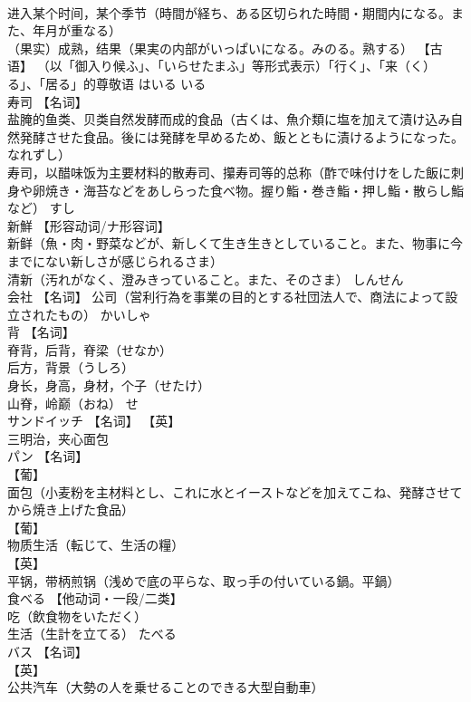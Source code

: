\documentclass[8pt]{extreport}
\begin{document}
\begin{CJK}{UTF8}{min}
\\	进入某个时间，某个季节（時間が経ち、ある区切られた時間・期間内になる。また、年月が重なる） 
\\	（果实）成熟，结果（果実の内部がいっぱいになる。みのる。熟する） 【古语】 （以「御入り候ふ」、「いらせたまふ」等形式表示）「行く」、「来（く）る」、「居る」的尊敬语	はいる いる	
\\	寿司	【名词】 
\\	盐腌的鱼类、贝类自然发酵而成的食品（古くは、魚介類に塩を加えて漬け込み自然発酵させた食品。後には発酵を早めるため、飯とともに漬けるようになった。なれずし） 
\\	寿司，以醋味饭为主要材料的散寿司、攥寿司等的总称（酢で味付けをした飯に刺身や卵焼き・海苔などをあしらった食べ物。握り鮨・巻き鮨・押し鮨・散らし鮨など）	すし	
\\	新鮮	【形容动词/ナ形容词】 
\\	新鲜（魚・肉・野菜などが、新しくて生き生きとしていること。また、物事に今までにない新しさが感じられるさま） 
\\	清新（汚れがなく、澄みきっていること。また、そのさま）	しんせん	
\\	会社	【名词】 公司（営利行為を事業の目的とする社団法人で、商法によって設立されたもの）	かいしゃ	
\\	背	【名词】 
\\	脊背，后背，脊梁（せなか） 
\\	后方，背景（うしろ） 
\\	身长，身高，身材，个子（せたけ） 
\\	山脊，岭巅（おね）	せ	
\\	サンドイッチ	【名词】 【英】
\\	三明治，夹心面包		
\\	パン	【名词】 
\\	【葡】
\\	面包（小麦粉を主材料とし、これに水とイーストなどを加えてこね、発酵させてから焼き上げた食品） 
\\	【葡】
\\	物质生活（転じて、生活の糧） 
\\	【英】
\\	平锅，带柄煎锅（浅めで底の平らな、取っ手の付いている鍋。平鍋）		
\\	食べる	【他动词・一段/二类】 
\\	吃（飲食物をいただく） 
\\	生活（生計を立てる）	たべる	
\\	バス	【名词】 
\\	【英】
\\	公共汽车（大勢の人を乗せることのできる大型自動車） 

\end{CJK}
\end{document}
